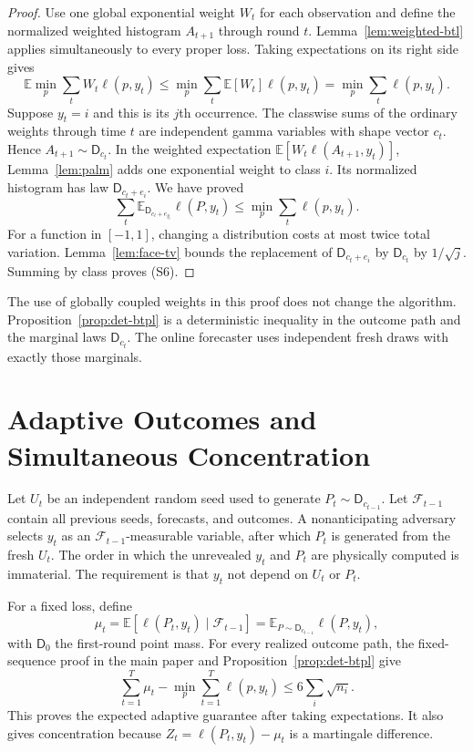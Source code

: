 \documentclass[twoside]{article}
\newcommand{\E}{\mathbb E}
\newcommand{\D}{\mathsf D}
\begin{document}
\begin{proof}
Use one global exponential weight $W_t$ for each observation and define the normalized weighted histogram $A_{t+1}$ through round $t$. Lemma~\ref{lem:weighted-btl} applies simultaneously to every proper loss. Taking expectations on its right side gives
\[
\E\min_p\sum_tW_t\ell(p,y_t)
\leq\min_p\sum_t\E[W_t]\ell(p,y_t)
=\min_p\sum_t\ell(p,y_t).
\tag{S7}
\]
Suppose $y_t=i$ and this is its $j$th occurrence. The classwise sums of the ordinary weights through time $t$ are independent gamma variables with shape vector $c_t$. Hence $A_{t+1}\sim\D_{c_t}$. In the weighted expectation $\E[W_t\ell(A_{t+1},y_t)]$, Lemma~\ref{lem:palm} adds one exponential weight to class $i$. Its normalized histogram has law $\D_{c_t+e_i}$. We have proved
\[
\sum_t\E_{\D_{c_t+e_{y_t}}}\ell(P,y_t)
\leq\min_p\sum_t\ell(p,y_t).
\tag{S8}
\]
For a function in $[-1,1]$, changing a distribution costs at most twice total variation. Lemma~\ref{lem:face-tv} bounds the replacement of $\D_{c_t+e_i}$ by $\D_{c_t}$ by $1/\sqrt j$. Summing by class proves (S6).
\end{proof}

The use of globally coupled weights in this proof does not change the algorithm. Proposition~\ref{prop:det-btpl} is a deterministic inequality in the outcome path and the marginal laws $\D_{c_t}$. The online forecaster uses independent fresh draws with exactly those marginals.

\section{Adaptive Outcomes and Simultaneous Concentration}

Let $U_t$ be an independent random seed used to generate $P_t\sim\D_{c_{t-1}}$. Let $\mathcal F_{t-1}$ contain all previous seeds, forecasts, and outcomes. A nonanticipating adversary selects $y_t$ as an $\mathcal F_{t-1}$-measurable variable, after which $P_t$ is generated from the fresh $U_t$. The order in which the unrevealed $y_t$ and $P_t$ are physically computed is immaterial. The requirement is that $y_t$ not depend on $U_t$ or $P_t$.

For a fixed loss, define
\[
\mu_t=\E[\ell(P_t,y_t)\mid\mathcal F_{t-1}]
=\E_{P\sim\D_{c_{t-1}}}\ell(P,y_t),
\]
with $\D_0$ the first-round point mass. For every realized outcome path, the fixed-sequence proof in the main paper and Proposition~\ref{prop:det-btpl} give
\[
\sum_{t=1}^T\mu_t-\min_p\sum_{t=1}^T\ell(p,y_t)
\leq6\sum_i\sqrt{n_i}.
\tag{S9}
\]
This proves the expected adaptive guarantee after taking expectations. It also gives concentration because $Z_t=\ell(P_t,y_t)-\mu_t$ is a martingale difference.
\end{document}
